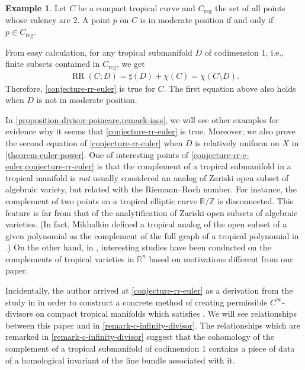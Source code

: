 \documentclass[a4paper,dvipdfmx,reqno,12pt]{amsart}
\theoremstyle{definition}
\newtheorem{example}[theorem]{Example}
\newcommand{\opn}[1]{\operatorname{#1}}
\numberwithin{equation}{section}
\begin{document}
\begin{example}
\label{example-permissible-point}
Let $C$ be a compact tropical curve 
and $C_{\mathrm{reg}}$ the set of all
points whose valency are $2$.
A point $p$ on $C$ is in moderate position
if and only if $p\in C_{\mathrm{reg}}$.

From easy calculation, for any 
tropical submanifold $D$ of codimension $1$, i.e.,
finite subsets contained in $C_{\mathrm{reg}}$, we get
\begin{align}
\opn{RR}(C;D)=\sharp (D)+ \chi(C)
=\chi(C\setminus D).
\end{align}
Therefore, \cref{conjecture-rr-euler} is true
for $C$. The first equation above also holds when
$D$ is not in moderate position.
\end{example}
In \cref{proposition-divisor-poincare,remark-iass},
we will see other examples for evidence 
why it seems that \cref{conjecture-rr-euler}
is true. Moreover, we also prove
the second equation of 
\cref{conjecture-rr-euler} when $D$ is 
relatively uniform on $X$ in
\cref{theorem-euler-power}.
One of interesting points of
\cref{conjecture-rr-c-euler,conjecture-rr-euler} is that
the complement of a tropical submanifold in
a tropical manifold is \emph{not} usually
considered an analog of Zariski open subset
of algebraic variety, but related with the
Riemann--Roch number.
For instance, the complement of two points 
on a tropical elliptic curve
$\mathbb{R}/\mathbb{Z}$ is disconnected.
This feature is far from that of the analytification of Zariski open subsets of
algebraic varieties.
(In fact, Mikhalkin defined
a tropical analog of the open subset of
a given polynomial as the complement of
the full graph \cite[]{MR2275625}
of a tropical polynomial in
\cite[Remark 3.5 and Example 3.6]{MR2275625}.)
On the other hand, in \cite{MR3498901,MR3968872}, 
interesting studies have been conducted on
the complements of tropical varieties in
$\mathbb{R}^n$ based on motivations
different from our paper.


Incidentally, the author arrived at
\cref{conjecture-rr-euler} as
a derivation from the study in
\cite{tsutsui2023graded} in order to
construct a concrete method of creating
permissible $C^{\infty}$-divisors on
compact tropical manifolds which
satisfies \cite[Conjecture 1.2]{tsutsui2023graded}. 
We will see relationships between 
this paper and \cite{tsutsui2023graded}
in \cref{remark-c-infinity-divisor}.
The relationships which are
remarked in \cref{remark-c-infinity-divisor}
suggest that the cohomology of the complement
of a tropical submanifold of codimension $1$
contains a piece of data
of a homological invariant of the line bundle
associated with it.
\end{document}
